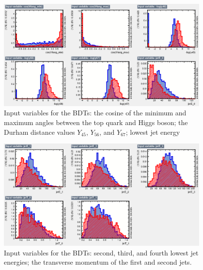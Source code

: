 \begin{figure}[p]
	\centering
	\includegraphics[width=0.95\textwidth]{../Pictures/Analysis/BDTs/variables_id_c4.eps}
	\caption{Input variables for the BDTs: the cosine of the minimum and maximum angles between the top quark and Higgs boson; the Durham distance values $Y_{45}$, $Y_{56}$, and $Y_{67}$; lowest jet energy}
	\label{figure:analysis/results/tmva-inputs-4}
\end{figure}

\begin{figure}[h]
	\centering
	\includegraphics[width=0.95\textwidth]{../Pictures/Analysis/BDTs/variables_id_c5.eps}
	\caption{Input variables for the BDTs: second, third, and fourth lowest jet energies; the transverse momentum of the first and second jets.}
	\label{figure:analysis/results/tmva-inputs-5}
\end{figure}

